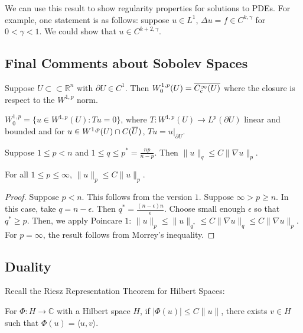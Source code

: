 \documentclass[12pt]{scrartcl}
\newcommand{\R}{\mathbb{R}}
\newcommand{\C}{\mathbb C}
\newcommand{\<}{\langle}
\renewcommand{\>}{\rangle}
\let \grad \nabla
\begin{document}
We can use this result to show regularity properties for solutions to PDEs.  For example, one statement is as follows: suppose $u \in L^1$, $\Delta u = f \in C^{k, \gamma}$ for $0 < \gamma < 1$.  We could show that $u \in C^{k+2, \gamma}$.
\subsection{Final Comments about Sobolev Spaces}
\begin{definition}
Suppose $U \subset \subset \R^n$ with $\partial U \in C^1$.  Then 
$W_0^{1,p}(U) = \overline{C_c^\infty(U)}$ where the closure is respect to the $W^{1, p}$ norm.  
\end{definition}

\begin{fact} $W_0^{1, p} = \{u \in W^{1, p}(U) : Tu = 0  \}$, where $T:W^{1, p}(U) \to L^{p}(\partial U)$ linear and bounded and for $u \in W^{1, p}(U) \cap C(\overline{U})$, $Tu = u\vert_{\partial U}$.
\end{fact}

\begin{fact} Suppose $1 \le p < n$ and $1 \le q \le p^* = \frac{np}{n-p}$.   Then $\|u\|_q \le C\|\grad u\|_p$.
\end{fact}
\begin{thm} For all $1 \le p \le \infty$, $\|u\|_p \le C\|u\|_p$.
\end{thm}
\begin{proof}
Suppose $p < n$.  This follows from the version $1$.  Suppose $\infty > p \ge n$.  In this case, take $q = n - \epsilon$.  Then $q^* = \frac{(n - \epsilon) n}{\epsilon}$.  Choose small enough $\epsilon$ so that $q^* \ge p$.  Then, we apply Poincare $1$:
$\|u\|_p \le \|u\|_{q^*} \le C\|\grad u\|_q \le C\| \grad u\|_p$.  For $p =\infty$, the result follows from Morrey's inequality.
\end{proof}

\subsection{Duality}
Recall the Riesz Representation Theorem for Hilbert Spaces:
\begin{thm} For $\Phi: H \to \C$ with a Hilbert space $H$, if $|\Phi(u)| \le C\|u\|$, there exists $v \in H$ such that $\Phi(u) = \<u, v\>$.
\end{thm}
\end{document}

